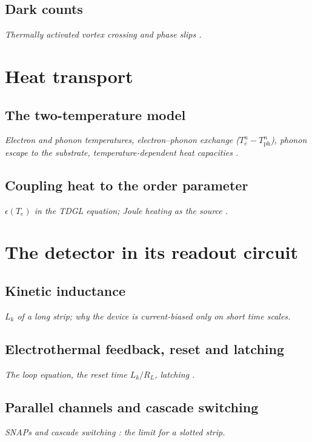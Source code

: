 \subsection{Dark counts}
\label{sec:th-dark}
\emph{Thermally activated vortex crossing and phase slips \cite{bartolf2010,bulaevskii2012}.}

\section{Heat transport}
\label{sec:th-heat}

\subsection{The two-temperature model}
\label{sec:th-2t}
\emph{Electron and phonon temperatures, electron--phonon exchange ($T_e^n - T_\mathrm{ph}^n$), phonon escape to the
substrate, temperature-dependent heat capacities \cite{vodolazov2017,sidorova2021,sidorova2022,annunziata2010}.}

\subsection{Coupling heat to the order parameter}
\label{sec:th-heat-coupling}
\emph{$\epsilon(T_e)$ in the TDGL equation; Joule heating as the source \cite{zotova2012}.}

\section{The detector in its readout circuit}
\label{sec:th-circuit}

\subsection{Kinetic inductance}
\label{sec:th-kinetic-inductance}
\emph{$L_k$ of a long strip; why the device is current-biased only on short time scales.}

\subsection{Electrothermal feedback, reset and latching}
\label{sec:th-latching}
\emph{The loop equation, the reset time $L_k/R_L$, latching \cite{kerman2006,kerman2009,annunziata2010}.}

\subsection{Parallel channels and cascade switching}
\label{sec:th-cascade-switching}
\emph{SNAPs and cascade switching \cite{ejrnaes2007,marsili2011}: the limit for a slotted strip.}
